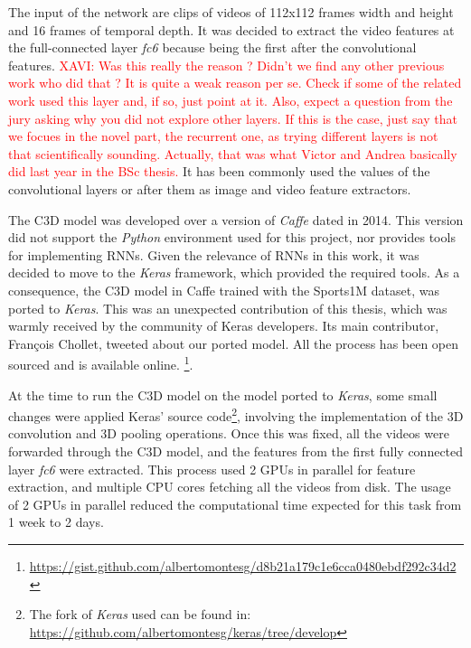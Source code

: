 The input of the network are clips of videos of 112x112 frames width and height and 16 frames of temporal depth. It was decided to extract the video features at the full-connected layer \textit{fc6} because being the first after the convolutional features. \textcolor{red}{XAVI: Was this really the reason ? Didn't we find any other previous work who did that ? It is quite a weak reason per se. Check if some of the related work used this layer and, if so, just point at it. Also, expect a question from the jury asking why you did not explore other layers. If this is the case, just say that we focues in the novel part, the recurrent one, as trying different layers is not that scientifically sounding. Actually, that was what Victor and Andrea basically did last year in the BSc thesis.} It has been commonly used the values of the convolutional layers or after them as image and video feature extractors.

The C3D model \cite{tran2014learning} was developed over a version of \textit{Caffe}\cite{jia2014caffe} dated in 2014. This version did not support the \textit{Python} environment used for this project, nor provides tools for implementing RNNs. Given the relevance of RNNs in this work, it was decided to move to the \textit{Keras} framework, which provided the required tools. As a consequence, the C3D model in Caffe  trained with the Sports1M\cite{KarpathyCVPR14} dataset, was ported to \textit{Keras}. This was an unexpected contribution of this thesis, which was warmly received by the community of Keras developers. Its main contributor, François Chollet, tweeted about our ported model. All the process has been open sourced and is available online. \footnote{ \url{https://gist.github.com/albertomontesg/d8b21a179c1e6cca0480ebdf292c34d2}}.


At the time to run the C3D model on the model ported to \textit{Keras}, some small changes were applied Keras' source code\footnote{The fork of \textit{Keras} used can be found in: \url{https://github.com/albertomontesg/keras/tree/develop}}, involving the implementation of the 3D convolution and 3D pooling operations. Once this was fixed, all the videos were forwarded through the C3D model, and the features from the first fully connected layer \textit{fc6} were extracted. This process used 2 GPUs in parallel for feature extraction, and multiple CPU cores fetching all the videos from disk. The usage of 2 GPUs in parallel reduced the computational time expected for this task from 1 week to 2 days.


